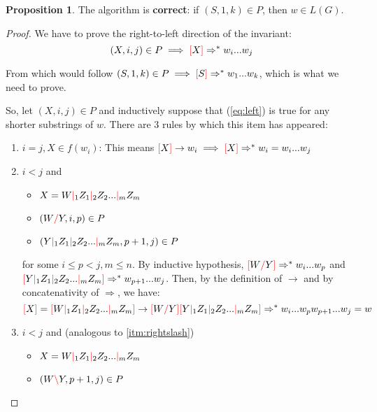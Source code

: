 \documentclass[12pt]{extarticle}
\theoremstyle{definition} \newtheorem{defn}{Definition}
\theoremstyle{definition} \newtheorem{prop}{Proposition}
\theoremstyle{definition} \newtheorem{property}{Property}
\newcommand{\lc}{\textcolor{red}{\backslash}}
\newcommand{\rc}{\textcolor{red}{/}}
\newcommand{\mc}{\textcolor{red}{|}}
\newcommand{\lb}{\textcolor{red}{[}}
\newcommand{\rb}{\textcolor{red}{]}}
\begin{document}
\begin{prop}
    The algorithm is \textbf{correct}: if $(S, 1, k) \in P$, then $w \in L(G)$.
\end{prop}
\begin{proof}
    We have to prove the right-to-left direction of the invariant:
    \begin{equation}\label{eq:left}
        (X, i, j) \in P \implies \lb X \rb \Rightarrow^* w_i ... w_j
    \end{equation}

    From which would follow $ (S, 1, k) \in P \implies \lb S \rb \Rightarrow^* w_1 ... w_k$,
    which is what we need to prove.

    So, let $(X, i, j) \in P$ and inductively suppose that (\ref{eq:left}) is true
    for any shorter substrings of $w$. There are 3 rules by which this item has appeared:
    \begin{enumerate}
        \item $i = j, X \in f(w_i)$: This means
            $\lb X \rb \rightarrow w_i \implies \lb X \rb \Rightarrow^* w_i = w_i ... w_j$
        \item \label{itm:rightslash} $i < j$ and
            \begin{itemize}
                \item $X = W \mc_1 Z_1 \mc_2 Z_2 ... \mc_m Z_m$
                \item $(W \rc Y, i, p) \in P$
                \item $(Y \mc_1 Z_1 \mc_2 Z_2 ... \mc_m Z_m, p + 1, j) \in P$
            \end{itemize}
            for some $i \leq p < j, m \leq n$. By inductive hypothesis,
            $\lb W \rc Y \rb \Rightarrow^* w_i ... w_p$
            and
            $\lb Y \mc_1 Z_1 \mc_2 Z_2 ... \mc_m Z_m \rb \Rightarrow^* w_{p + 1} ... w_j$.
            Then, by the definition of $\rightarrow$ and by concatenativity of
            $\Rightarrow$, we have:
            \[
                \lb X \rb = \lb W \mc_1 Z_1 \mc_2 Z_2 ... \mc_m Z_m \rb
                \rightarrow
                \lb W \rc Y \rb \lb Y \mc_1 Z_1 \mc_2 Z_2 ... \mc_m Z_m \rb
                \Rightarrow^*
                w_i ... w_p w_{p + 1} ... w_j = w
            \]
        \item $i < j$ and (analogous to \ref{itm:rightslash})
            \begin{itemize}
                \item $X = W \mc_1 Z_1 \mc_2 Z_2 ... \mc_m Z_m$
                \item $(W \lc Y, p + 1, j) \in P$

\end{itemize}
\end{enumerate}
\end{proof}
\end{document}
